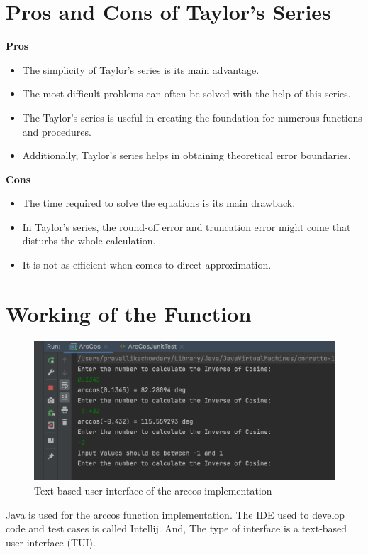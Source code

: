 \documentclass{article}
\begin{document}
    \section{Pros and Cons of Taylor’s Series}
    \textbf{Pros}
    \begin{itemize}
        \item The simplicity of Taylor's series is its main advantage.
        \item The most difficult problems can often be solved with the help of this series.
        \item The Taylor's series is useful in creating the foundation for numerous functions and procedures.
        \item Additionally, Taylor's series helps in obtaining theoretical error boundaries.
    \end{itemize}
    \textbf{Cons}
    \begin{itemize}
        \item The time required to solve the equations is its main drawback.
        \item In Taylor's series, the round-off error and truncation error might come that disturbs the whole calculation.
        \item It is not as efficient when comes to direct approximation.
    \end{itemize}
    \section{Working of the Function}
    \begin{figure}[hbt!]
        \centering
        \includegraphics[width=1.2\textwidth]{Images/JavaImplementation.png}
        \caption{Text-based user interface of the arccos implementation}
        \label{fig:Speed vs. Torque from Pittman}
    \end{figure}
    \par
    Java is used for the arccos function implementation. The IDE used to develop code and test cases is called Intellij. And, The type of interface is a text-based user interface (TUI).
\end{document}
